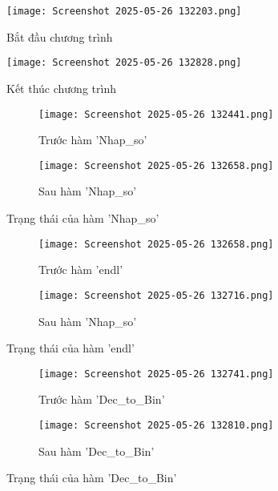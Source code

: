 \begin{figure}[H]
    \centering
    \texttt{[image: Screenshot 2025-05-26 132203.png]}
    \caption{Bắt đầu chương trình}
    \label{fig:bat_dau_chuong_trinh}
    \vspace{0.6cm}
    

    \texttt{[image: Screenshot 2025-05-26 132828.png]}
    \caption{Kết thúc chương trình}
    \label{fig:ket_thuc_chuong_trinh}
    \vspace{0.6cm}

    \begin{subfigure}[b]{0.45\linewidth}
        \centering
        \texttt{[image: Screenshot 2025-05-26 132441.png]}
        \caption{Trước hàm 'Nhap\_so'}
        \label{fig:truoc_nhap_so}
    \end{subfigure}
    \hfill
    \begin{subfigure}[b]{0.45\linewidth}
        \centering
        \texttt{[image: Screenshot 2025-05-26 132658.png]}
        \caption{Sau hàm 'Nhap\_so'}\label{fig:sau_nhap_so}
    \end{subfigure}
    \caption{Trạng thái của hàm 'Nhap\_so'}
    \label{fig:ham_nhap_so}
    \vspace{0.6cm}

\end{figure}


\begin{figure}[H]
    \begin{subfigure}[b]{0.45\linewidth}
        \centering
        \texttt{[image: Screenshot 2025-05-26 132658.png]}
        \caption{Trước hàm 'endl'}\label{fig:truoc_endl}
    \end{subfigure}
    \hfill
    \begin{subfigure}[b]{0.45\linewidth}
        \centering
        \texttt{[image: Screenshot 2025-05-26 132716.png]}
        \caption{Sau hàm 'Nhap\_so'}\label{fig:sau_endl}
    \end{subfigure}
    \caption{Trạng thái của hàm 'endl'}
    \label{fig:ham_endl}

    \vspace{0.6cm}
    
    \centering
    \begin{subfigure}[b]{0.45\linewidth}
        \centering
        \texttt{[image: Screenshot 2025-05-26 132741.png]}
        \caption{Trước hàm 'Dec\_to\_Bin'}\label{fig:truoc_dec_to_bin}
    \end{subfigure}
    \hfill
    \begin{subfigure}[b]{0.45\linewidth}
        \centering
        \texttt{[image: Screenshot 2025-05-26 132810.png]}
        \caption{Sau hàm 'Dec\_to\_Bin'}\label{fig:sau_dec_to_bin}
    \end{subfigure}
    \caption{Trạng thái của hàm 'Dec\_to\_Bin'}
    \label{fig:ham_dec_to_bin}


\end{figure}

